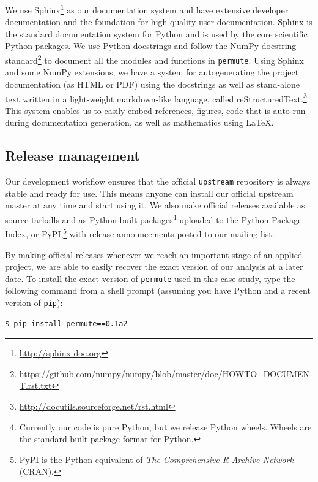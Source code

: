 \documentclass[]{article}
\begin{document}
We use Sphinx\footnote{
   \url{http://sphinx-doc.org}
} 
as our documentation system
and have extensive developer documentation and the foundation for
high-quality user documentation.
Sphinx is the standard documentation system for Python and is used by
the core scientific Python packages.
We use Python docstrings and follow the NumPy docstring
standard\footnote{
   \url{https://github.com/numpy/numpy/blob/master/doc/HOWTO\_DOCUMENT.rst.txt}
}
to document all the modules and functions in \texttt{permute}.
Using Sphinx and some NumPy extensions, we have a system for autogenerating the
project documentation (as HTML or PDF) using the docstrings as well as
stand-alone text written in a light-weight markdown-like language, called
reStructuredText.\footnote{
\url{http://docutils.sourceforge.net/rst.html}
}
This system enables us to easily embed references, figures, code that is
auto-run during documentation generation, as well as mathematics using \LaTeX.

\subsection{Release management}

Our development workflow ensures that the official \texttt{upstream} repository
is always stable and ready for use.
This means anyone can install our official upstream master at any time
and start using it.
We also make official releases available as source tarballs and as Python
built-packages\footnote{
   Currently our code is pure Python, but we release Python wheels.
   Wheels are the standard built-package format for Python.
} uploaded to the
Python Package Index, or PyPI,\footnote{
   PyPI is the Python equivalent of \emph{The
   Comprehensive R Archive Network} (CRAN).
} with release announcements posted to our mailing list.

By making official releases whenever we reach an important stage of an
applied project, we are able to easily recover the exact version of our
analysis at a later date.
To install the exact version of \texttt{permute} used in this case study, type
the following command from a shell prompt (assuming you have Python and a
recent version of \texttt{pip}):
\begin{verbatim}
$ pip install permute==0.1a2
\end{verbatim}




\pagebreak
\end{document}
